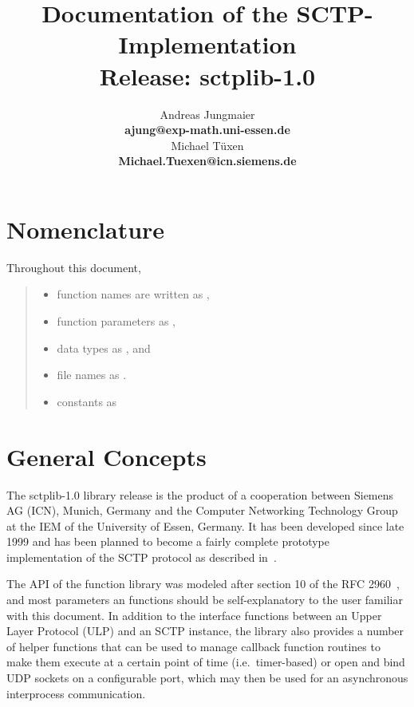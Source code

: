 \documentclass[10pt]{article}
\title{Documentation of the SCTP-Implementation\\
	 Release: sctplib-1.0}
\author{Andreas Jungmaier\\
    \textbf{ajung@exp-math.uni-essen.de}\\
	Michael T\"{u}xen\\
	\textbf{Michael.Tuexen@icn.siemens.de}}
\newcommand{\p}{\medskip \noindent }
\begin{document}
\maketitle

\fancyhf{}
\section{Nomenclature}
Throughout this document, 
\begin{quote}
\begin{itemize}
\item function names are written as ,
\item function parameters as , 
\item data types as , and
\item file names as .
\item constants as 
\end{itemize}
\end{quote}

\section{General Concepts}
The sctplib-1.0 library release is the product of a cooperation between
Siemens AG (ICN), Munich, Germany and the Computer Networking Technology Group
at the IEM of the University of Essen, Germany.
It has been developed since late 1999 and has been planned to become a fairly
complete prototype implementation of the SCTP protocol as described in~\cite{RFC2960}.

\p
The API of the function library was modeled after section 10 of the
RFC 2960~\cite{RFC2960},
and most parameters an functions should be self-explanatory to the user familiar
with this document.
In addition to the interface functions between an Upper Layer Protocol (ULP)
and an SCTP instance,
the library also provides a number of helper functions that can be used
to manage callback function routines to make them execute at a certain point of 
time (i.e.\ timer-based)
or open and bind  UDP sockets on a configurable port, which may then be used
for an asynchronous interprocess communication.
\end{document}
